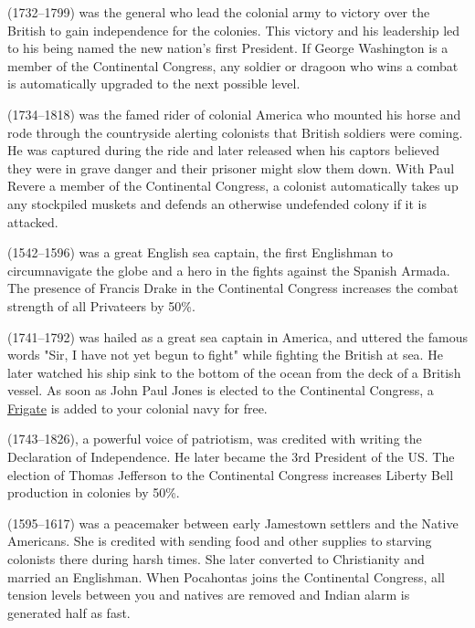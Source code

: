 \documentclass[12pt]{book}
\begin{document}
 (1732--1799) was the general who lead the
colonial army to victory over the British to gain independence for the
colonies. This victory and his leadership led to his being named the
new nation's first President. If George Washington is a member of the
Continental Congress, any soldier or dragoon who wins a combat is
automatically upgraded to the next possible
level. 

 (1734--1818) was the famed rider of colonial
America who mounted his horse and rode through the countryside
alerting colonists that British soldiers were coming. He was captured
during the ride and later released when his captors believed they were
in grave danger and their prisoner might slow them down. With Paul
Revere a member of the Continental Congress, a colonist automatically
takes up any stockpiled muskets and defends an otherwise undefended
colony if it is attacked. 

 (1542--1596) was a great English sea captain,
the first Englishman to circumnavigate the globe and a hero in the
fights against the Spanish Armada. The presence of Francis Drake in
the Continental Congress increases the combat strength of all
Privateers by 50\%. 

 (1741--1792) was hailed as a great sea
captain in America, and uttered the famous words "Sir, I have not yet
begun to fight" while fighting the British at sea. He later watched
his ship sink to the bottom of the ocean from the deck of a British
vessel. As soon as John Paul Jones is elected to the Continental
Congress, a \hyperlink{Frigate}{Frigate} is added to your colonial
navy for free. 

 (1743--1826), a powerful voice of
patriotism, was credited with writing the Declaration of
Independence. He later became the 3rd President of the US. The
election of Thomas Jefferson to the Continental Congress increases
Liberty Bell production in colonies by
50\%. 

 (1595--1617) was a peacemaker between early
Jamestown settlers and the Native Americans. She is credited with
sending food and other supplies to starving colonists there during
harsh times.  She later converted to Christianity and married an
Englishman.  When Pocahontas joins the Continental Congress, all
tension levels between you and natives are removed and Indian alarm is
generated half as fast. 
\end{document}
